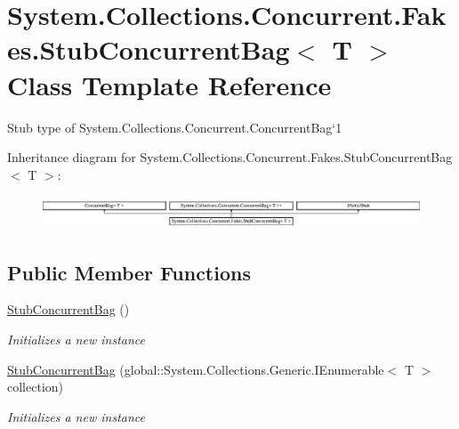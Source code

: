 \hypertarget{class_system_1_1_collections_1_1_concurrent_1_1_fakes_1_1_stub_concurrent_bag_3_01_t_01_4}{\section{System.\-Collections.\-Concurrent.\-Fakes.\-Stub\-Concurrent\-Bag$<$ T $>$ Class Template Reference}
\label{class_system_1_1_collections_1_1_concurrent_1_1_fakes_1_1_stub_concurrent_bag_3_01_t_01_4}
}


Stub type of System.\-Collections.\-Concurrent.\-Concurrent\-Bag`1 


Inheritance diagram for System.\-Collections.\-Concurrent.\-Fakes.\-Stub\-Concurrent\-Bag$<$ T $>$\-:\begin{figure}[H]
\begin{center}
\leavevmode
\includegraphics[height=0.987654cm]{class_system_1_1_collections_1_1_concurrent_1_1_fakes_1_1_stub_concurrent_bag_3_01_t_01_4}
\end{center}
\end{figure}
\subsection*{Public Member Functions}
\begin{DoxyCompactItemize}
\item 
\hyperlink{class_system_1_1_collections_1_1_concurrent_1_1_fakes_1_1_stub_concurrent_bag_3_01_t_01_4_aa2ee887cb9d31d9c3428ed2af762d6f8}{Stub\-Concurrent\-Bag} ()
\begin{DoxyCompactList}\small\item\em Initializes a new instance\end{DoxyCompactList}\item 
\hyperlink{class_system_1_1_collections_1_1_concurrent_1_1_fakes_1_1_stub_concurrent_bag_3_01_t_01_4_acdafc74b0c192640337a0f7d0c6d33a9}{Stub\-Concurrent\-Bag} (global\-::\-System.\-Collections.\-Generic.\-I\-Enumerable$<$ T $>$ collection)
\begin{DoxyCompactList}\small\item\em Initializes a new instance\end{DoxyCompactList}\end{DoxyCompactItemize}
